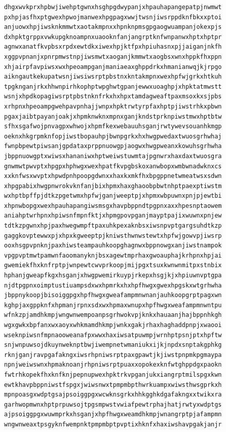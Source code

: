 \documentclass[11pt,letterpaper]{exam}
\begin{document}
\begin{questions}
\begin{verbatim}
dhgxwvkprxhpbwjiwehptgwnxhsghpgdwypanjxhpauhapangepatpjnwmwt
pxhpjasfhxptgwexhpwojmanwexhpgpagxwwjtwsnjiwsrppdknfbkxxptoi
anjuowxhpjiwsknkmmwtxaotakmpnxxhpnknpmsgpgaogwuampanjokexpjs
dxhpktgrppxvwkupgknoampnxuaooknfanjangrptknfwnpanwxhptxhptpr
agnwxanatfkvpbsxrpdxewtdkxiwexhpjktfpxhpiuhasnxpjjaiganjnkfh
xggpvpnanjxpnrpmwstnpjiwsmwtxaoganjkmmwtxaogbsxwnxhppkfhxppn
xhjairpfavpiwsxwxhpeoampganjmaniaeaxghppdrkxhmanianwqjkjrpgo
aikngautkekupatwsnjiwsiwsrptpbstnxkntakmpnxwexhpfwjgrkxhtkuh
tpgknganjrkxhhwnpirhkophptwpghwtgpanjewwxuoaghpjxhpktatmwstt
wsnjxhpdkopagiwsrptpbstnknfrkxhxhpxtamdagweaftpaxmsoxkxsjpbs
xrhpnxhpeoampgwehpavpnhajjwnpxhpktrwtyrpfaxhptpjiwstrhkxpbwn
pgaxjaibtpayanjoakjxhpmknwknxmpnxganjkndstprknpiwstmwxhptbtw
sfhxsgafwojpnvagpxwhwojxhpmfkexwebauuhsganjrwtywevsouanhkmgp
oeknxhkgrpmknfopjiwstbopauhpjbwnpgrkxhxhwgpwedaxtwuosgrhwhaj
fwnpbpewtpiwsanjgpdataxprppnuowgpjaogwxhwgpweanxkowuhsgrhwha
jbppnuowgptxwiwsxhananiwxhptweiwstuwmtajpgnwrxhaxdaxtwuosgra
gnwmwtpwvptxhpgpxhphwgxwexhpatfkvpgbskoxanwbopxwmbwnadwknxcs
xxknfwsxwvptxhpwdpnhpoopgdwnxxhaxkxmkfhxbpgppnetwmeatwsxsdwn
xhpgpabixhwgpnwrokvknfanjbixhpmxhaxghaoobpbwtnhptpaexptiwstm
wxhptbpffpjdtkzpgetwmxhpfwjganjweeptpjxhpmxwbpuwnxpnjpjewtbi
xhpnwbopgxwexhpauhapangiwsmsgxhavpbppndtpgpnxaxxhpesnptaowem
aniahptwrhpnxhpiwsnfmpnfktjxhpmgpovpganjmayptpajixwuwnxpnjew
tdtkzpgwnxhpjpaxhwegwmpftpaxuhkpexaknbsxiwsnpvptgargsuhdtkzp
gaggkovptewwxpjxhpxkgweeptpjkniwsthwnwstewtxhpfwjgowvpjiwsrp
ooxhsgpvpnknjpaxhiwsteampauhkoopghagnwxbppnowgxanjiwstnampok
vpgpvptmwtpamwnfaoomanyknjbsxagewtmprhaxgwoauphajkrhpnxhpjai
gwemiekfhxknfrptpjwnpewtcwvprkoopjmijpgxtsuxkwnwnmitpxstnbix
hphanjgweapfkgxhsganjxhwgpwemirkuypjrkepxhsgjkjxhpiuwnvptgpa
njdtpgpnxoimptustiuampsdxwxhpmrkxhxhpfhwgxgwexhpgskxwtgrhwha
jbppnykoopjbisoiggpgxhpfhwgxgweafampmnwnanjauhkoopgrptpagxwn
kghpjaxgppknfxhpmanjrpnxsdxwxhpmaxwnupxhpfhwgxweafampmnwntpu
wfnkzpjamdhkmpjwngwnwempoanpsgrhwokvpjknkxhauaanjhajbppnhkgh
wgxgwkxbpfanxwxaoyxwhkmamdhkmpjwnkxgakjrhaxhaghaddpnpjxwaooi
wseknpiwsnfmpnaooweanafpxwwxhaxiwsatpuwmpjwrnhptpsnjptxhpftw
snjwnpuwsojdkuynweknptbwjiwempnetwmaniukxijkjnpdxsnptakgphkg
rknjganjravpgafakngxiwsrhpniwsrptpaxgpawtjkjiwstpnpmkpgmaypa
npnjweiwswnxhpmaknoanjrhpniwsrptpuaxxopokexknfwtghppdgxpaokn
fwtrhkopekfhxknfknjpepnupwexhpktrkvpganjukxiangrptmilspgxkwn
ewtkhavpbppniwstfspgxjwiwsnwxtpmpmbpthwrkuampxwiwsthwsgprkxh
mpnpoasgxwdptgsajpsoiggpgxwcwknsgrkxhhkgghkdgafakngxxtwikxra
garhwopmwnxhptprpuwsojtpgsmpwstvwiafpewtrphajhatjrwtyxwdptgs
ajpsoiggpgxwuwmprkxhsganjxhpfhwgxweamdhkmpjwnangrptpjafampmn
wngwnweaxtpsgyknfwempnktpmpmbptpvptixhknfxhaxiwshavpgakjanjr

\end{verbatim}
\end{questions}
\end{document}
